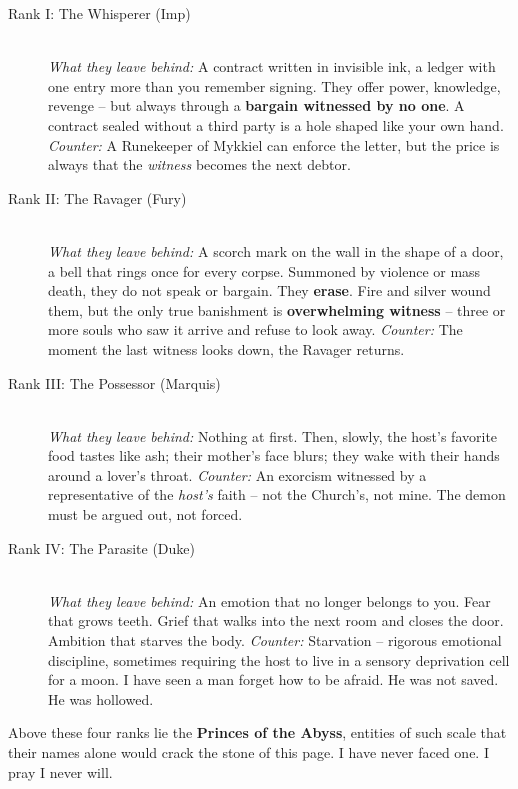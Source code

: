 \begin{description}
  \item[Rank I: The Whisperer (Imp)] \hfill \\
  \emph{What they leave behind:} A contract written in invisible ink, a ledger with one entry more than you remember signing.  
  They offer power, knowledge, revenge -- but always through a \textbf{bargain witnessed by no one}. A contract sealed without a third party is a hole shaped like your own hand.  
  \emph{Counter:} A Runekeeper of Mykkiel can enforce the letter, but the price is always that the \emph{witness} becomes the next debtor.

  \item[Rank II: The Ravager (Fury)] \hfill \\
  \emph{What they leave behind:} A scorch mark on the wall in the shape of a door, a bell that rings once for every corpse.  
  Summoned by violence or mass death, they do not speak or bargain. They \textbf{erase}. Fire and silver wound them, but the only true banishment is \textbf{overwhelming witness} -- three or more souls who saw it arrive and refuse to look away.  
  \emph{Counter:} The moment the last witness looks down, the Ravager returns.

  \item[Rank III: The Possessor (Marquis)] \hfill \\
  \emph{What they leave behind:} Nothing at first. Then, slowly, the host's favorite food tastes like ash; their mother's face blurs; they wake with their hands around a lover's throat.  
  \emph{Counter:} An exorcism witnessed by a representative of the \emph{host's} faith -- not the Church's, not mine. The demon must be argued out, not forced.  

  \item[Rank IV: The Parasite (Duke)] \hfill \\
  \emph{What they leave behind:} An emotion that no longer belongs to you. Fear that grows teeth. Grief that walks into the next room and closes the door. Ambition that starves the body.  
  \emph{Counter:} Starvation -- rigorous emotional discipline, sometimes requiring the host to live in a sensory deprivation cell for a moon. I have seen a man forget how to be afraid. He was not saved. He was hollowed.
\end{description}

\noindent
Above these four ranks lie the \textbf{Princes of the Abyss}, entities of such scale that their names alone would crack the stone of this page. I have never faced one. I pray I never will.

